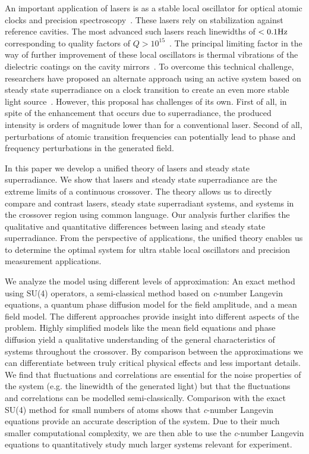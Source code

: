 \documentclass[aps,
twocolumn,
showpacs,
superscriptaddress,groupedaddress]{revtex4}
\begin{document}
An important application of lasers is as a stable local oscillator for
optical atomic clocks and precision
spectroscopy~\cite{RevModPhys.87.637}.  These lasers rely on
stabilization against reference cavities.  The most advanced such
lasers reach linewidths of $< 0.1 {\rm Hz}$ corresponding to quality
factors of $Q>10^{15}$~\cite{Cole:TenfoldReductionBrownianNoise}. The
principal limiting factor in the way of further improvement of these
local oscillators is thermal vibrations of the dielectric coatings on
the cavity mirrors~\cite{PhysRevLett.101.260602}.  To overcome this
technical challenge, researchers have proposed an alternate approach
using an active system based on steady state superradiance on a clock
transition to create an even more stable light
source~\cite{PhysRevLett.102.163601, ChenDeliciousLaser}.  However,
this proposal has challenges of its own.  First of all, in spite of
the enhancement that occurs due to superradiance, the produced
intensity is orders of magnitude lower than for a conventional laser.
Second of all, perturbations of atomic transition frequencies can
potentially lead to phase and frequency perturbations in the generated
field.

In this paper we develop a unified theory of lasers and steady state
superradiance.  We show that lasers and steady state superradiance are
the extreme limits of a continuous crossover.  The theory allows us to
directly compare and contrast lasers, steady state superradiant
systems, and systems in the crossover region using common language.
Our analysis further clarifies the qualitative and quantitative
differences between lasing and steady state superradiance.  From the
perspective of applications, the unified theory enables us to
determine the optimal system for ultra stable local oscillators and
precision measurement applications.

We analyze the model using different levels of approximation: An exact
method using SU(4) operators, a semi-classical method based on {\it
c}-number Langevin equations, a quantum phase diffusion model for the
field amplitude, and a mean field model.  The different approaches provide insight into
different aspects of the problem.  Highly simplified models like the
mean field equations and phase diffusion yield a qualitative
understanding of the general characteristics of systems throughout the
crossover.  By comparison between the approximations we can
differentiate between truly critical physical effects and less important
details.  We find that fluctuations and correlations are essential for
the noise properties of the system (e.g. the linewidth of the generated
light) but that the fluctuations and correlations can be modelled
semi-classically.  Comparison with the exact SU(4) method for small
numbers of atoms shows that {\it c}-number Langevin equations provide an
accurate description of the system.  Due to their much smaller
computational complexity, we are then able to use the {\it c}-number
Langevin equations to quantitatively study much larger systems relevant
for experiment.
\end{document}
